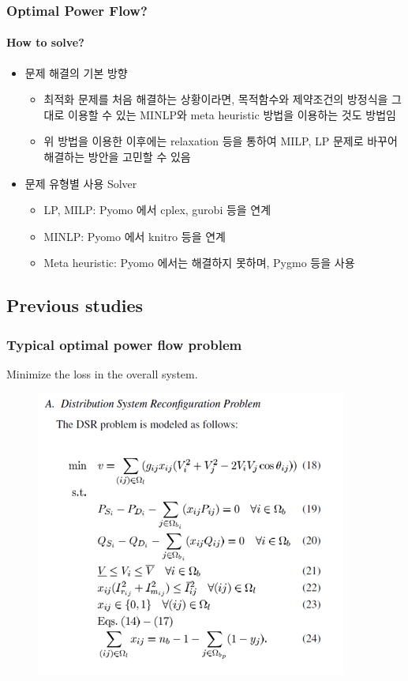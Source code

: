 \documentclass[
	11pt, %
	aspectratio=169, %
]{beamer}
\begin{document}
\begin{frame}
	\frametitle{Optimal Power Flow?}
	\framesubtitle{How to solve?} %
	
	\begin{itemize}
		\item 문제 해결의 기본 방향
		\begin{itemize}
			\item 최적화 문제를 처음 해결하는 상황이라면, 목적함수와 제약조건의 방정식을 그대로 이용할 수 있는 MINLP와 meta heuristic 방법을 이용하는 것도 방법임
			\item 위 방법을 이용한 이후에는 relaxation 등을 통하여 MILP, LP 문제로 바꾸어 해결하는 방안을 고민할 수 있음
		\end{itemize}
		
		\item 문제 유형별 사용 Solver
		\begin{itemize}
			\item LP, MILP: Pyomo 에서 cplex, gurobi 등을 연계
			\item MINLP: Pyomo 에서 knitro 등을 연계
			\item Meta heuristic: Pyomo 에서는 해결하지 못하며, Pygmo 등을 사용
		\end{itemize}

	\end{itemize}
	
\end{frame}


\subsection{Previous studies}

\begin{frame}
	\frametitle{Typical optimal power flow problem}
	
	Minimize the loss in the overall system\parencite{5982115}.

	\begin{figure}
		\includegraphics[width=2.5 in,keepaspectratio]{typ_opf.png}
	\end{figure}
	
	
\end{frame}
\end{document}
